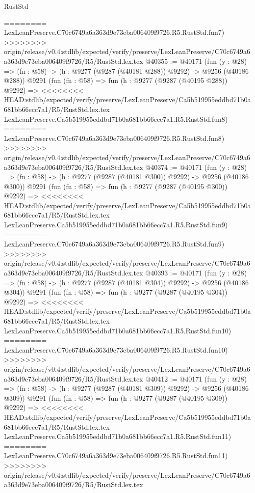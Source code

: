\begin{lexlean}{RustStd}
\begin{coremodule}
{\begin{coremodule}
{{{{{{{{{{{{{{{{{{{{{{{{{{{{{{{{{{{{{{{{{{{{{{{{{{{{{{{========
    LexLeanPreserve.C70c6749a6a363d9e73eba006409f9726.R5.RustStd.fun7)
>>>>>>>> origin/release/v0.4:stdlib/expected/verify/preserve/LexLeanPreserve/C70c6749a6a363d9e73eba006409f9726/R5/RustStd.lex.tex
@40355 := @40171
    (fun (y : @28) => (fn : @58) -> (h : @9277 (@9287 (@40181 @288)) @9292) -> @9256 (@40186 @288))
    @9291
    (fun (fn : @58) =>
    fun (h : @9277 (@9287 (@40195 @288)) @9292) =>
<<<<<<<< HEAD:stdlib/expected/verify/preserve/LexLeanPreserve/Ca5b519955eddbd71b0a681bb66ecc7a1/R5/RustStd.lex.tex
    LexLeanPreserve.Ca5b519955eddbd71b0a681bb66ecc7a1.R5.RustStd.fun8)
========
    LexLeanPreserve.C70c6749a6a363d9e73eba006409f9726.R5.RustStd.fun8)
>>>>>>>> origin/release/v0.4:stdlib/expected/verify/preserve/LexLeanPreserve/C70c6749a6a363d9e73eba006409f9726/R5/RustStd.lex.tex
@40374 := @40171
    (fun (y : @28) => (fn : @58) -> (h : @9277 (@9287 (@40181 @300)) @9292) -> @9256 (@40186 @300))
    @9291
    (fun (fn : @58) =>
    fun (h : @9277 (@9287 (@40195 @300)) @9292) =>
<<<<<<<< HEAD:stdlib/expected/verify/preserve/LexLeanPreserve/Ca5b519955eddbd71b0a681bb66ecc7a1/R5/RustStd.lex.tex
    LexLeanPreserve.Ca5b519955eddbd71b0a681bb66ecc7a1.R5.RustStd.fun9)
========
    LexLeanPreserve.C70c6749a6a363d9e73eba006409f9726.R5.RustStd.fun9)
>>>>>>>> origin/release/v0.4:stdlib/expected/verify/preserve/LexLeanPreserve/C70c6749a6a363d9e73eba006409f9726/R5/RustStd.lex.tex
@40393 := @40171
    (fun (y : @28) => (fn : @58) -> (h : @9277 (@9287 (@40181 @304)) @9292) -> @9256 (@40186 @304))
    @9291
    (fun (fn : @58) =>
    fun (h : @9277 (@9287 (@40195 @304)) @9292) =>
<<<<<<<< HEAD:stdlib/expected/verify/preserve/LexLeanPreserve/Ca5b519955eddbd71b0a681bb66ecc7a1/R5/RustStd.lex.tex
    LexLeanPreserve.Ca5b519955eddbd71b0a681bb66ecc7a1.R5.RustStd.fun10)
========
    LexLeanPreserve.C70c6749a6a363d9e73eba006409f9726.R5.RustStd.fun10)
>>>>>>>> origin/release/v0.4:stdlib/expected/verify/preserve/LexLeanPreserve/C70c6749a6a363d9e73eba006409f9726/R5/RustStd.lex.tex
@40412 := @40171
    (fun (y : @28) => (fn : @58) -> (h : @9277 (@9287 (@40181 @309)) @9292) -> @9256 (@40186 @309))
    @9291
    (fun (fn : @58) =>
    fun (h : @9277 (@9287 (@40195 @309)) @9292) =>
<<<<<<<< HEAD:stdlib/expected/verify/preserve/LexLeanPreserve/Ca5b519955eddbd71b0a681bb66ecc7a1/R5/RustStd.lex.tex
    LexLeanPreserve.Ca5b519955eddbd71b0a681bb66ecc7a1.R5.RustStd.fun11)
========
    LexLeanPreserve.C70c6749a6a363d9e73eba006409f9726.R5.RustStd.fun11)
>>>>>>>> origin/release/v0.4:stdlib/expected/verify/preserve/LexLeanPreserve/C70c6749a6a363d9e73eba006409f9726/R5/RustStd.lex.tex
}}}}}}}}}}}}}}}}}}}}}}}}}}}}}}}}}}}}}}}}}}}}}}}}}}}}}}}
\end{coremodule}}
\end{coremodule}
\end{lexlean}

